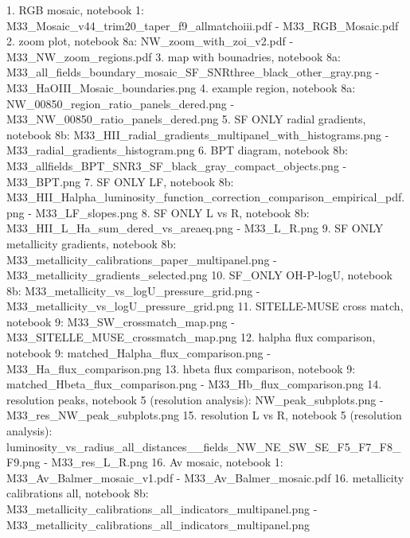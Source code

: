 1. RGB mosaic, notebook 1: M33_Mosaic_v44_trim20_taper_f9_allmatchoiii.pdf - M33_RGB_Mosaic.pdf
2. zoom plot, notebook 8a: NW_zoom_with_zoi_v2.pdf - M33_NW_zoom_regions.pdf
3. map with bounadries, notebook 8a: M33_all_fields_boundary_mosaic_SF_SNRthree_black_other_gray.png - M33_HaOIII_Mosaic_boundaries.png
4. example region, notebook 8a: NW_00850_region_ratio_panels_dered.png - M33_NW_00850_ratio_panels_dered.png
5. SF ONLY radial gradients, notebook 8b: M33_HII_radial_gradients_multipanel_with_histograms.png  - M33_radial_gradients_histogram.png
6. BPT diagram, notebook 8b: M33_allfields_BPT_SNR3_SF_black_gray_compact_objects.png - M33_BPT.png
7. SF ONLY LF, notebook 8b: M33_HII_Halpha_luminosity_function_correction_comparison_empirical_pdf.png - M33_LF_slopes.png
8. SF ONLY L vs R, notebook 8b: M33_HII_L_Ha_sum_dered_vs_areaeq.png - M33_L_R.png
9. SF ONLY metallicity gradients, notebook 8b: M33_metallicity_calibrations_paper_multipanel.png - M33_metallicity_gradients_selected.png
10. SF_ONLY OH-P-logU, notebook 8b: M33_metallicity_vs_logU_pressure_grid.png - M33_metallicity_vs_logU_pressure_grid.png
11. SITELLE-MUSE cross match, notebook 9: M33_SW_crossmatch_map.png - M33_SITELLE_MUSE_crossmatch_map.png
12. halpha flux comparison, notebook 9: matched_Halpha_flux_comparison.png - M33_Ha_flux_comparison.png
13. hbeta flux comparison, notebook 9: matched_Hbeta_flux_comparison.png - M33_Hb_flux_comparison.png
14. resolution peaks, notebook 5 (resolution analysis): NW_peak_subplots.png - M33_res_NW_peak_subplots.png
15. resolution L vs R, notebook 5 (resolution analysis): luminosity_vs_radius_all_distances__fields_NW_NE_SW_SE_F5_F7_F8_F9.png - M33_res_L_R.png
16. Av mosaic, notebook 1: M33_Av_Balmer_mosaic_v1.pdf - M33_Av_Balmer_mosaic.pdf
16. metallicity calibrations all, notebook 8b: M33_metallicity_calibrations_all_indicators_multipanel.png - M33_metallicity_calibrations_all_indicators_multipanel.png